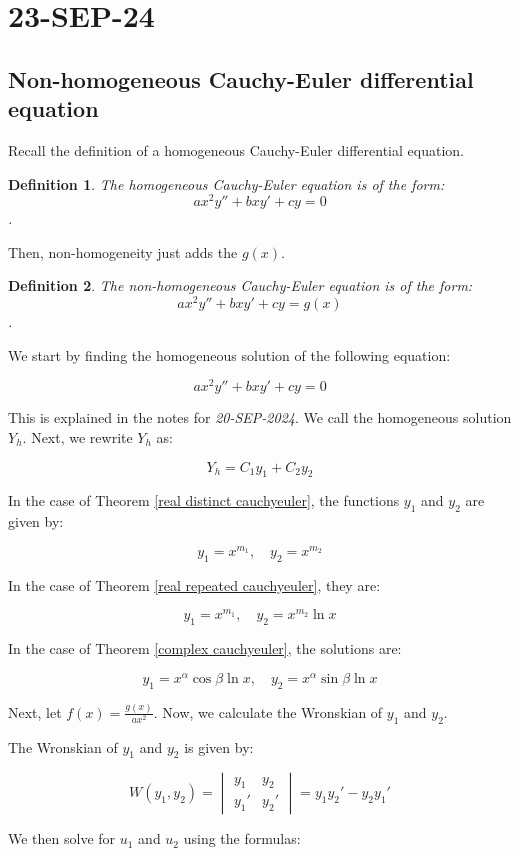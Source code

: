 \documentclass{article}
\newtheorem{defn}{Definition}
\theoremstyle{definition}
\begin{document}
\section{23-SEP-24}
\subsection{Non-homogeneous Cauchy-Euler differential equation}
Recall the definition of a homogeneous Cauchy-Euler differential equation.
\begin{defn}
    The homogeneous Cauchy-Euler equation is of the form:
    \[ ax^2y'' + bxy' + cy = 0 \]. 
\end{defn}

Then, non-homogeneity just adds the $g(x)$.
\begin{defn}
    The non-homogeneous Cauchy-Euler equation is of the form:
    \[ ax^2y'' + bxy' + cy = g(x) \]. 
\end{defn}

We start by finding the homogeneous solution of the following equation:

\[
ax^2 y'' + bxy' + cy = 0
\]

This is explained in the notes for \textit{20-SEP-2024}. We call the homogeneous solution \( Y_h \). Next, we rewrite \( Y_h \) as:

\[
Y_h = C_1 y_1 + C_2 y_2
\]

In the case of Theorem \ref{real distinct cauchyeuler}, the functions \( y_1 \) and \( y_2 \) are given by:

\[
y_1 = x^{m_1}, \quad y_2 = x^{m_2}
\]

In the case of Theorem \ref{real repeated cauchyeuler}, they are:

\[
y_1 = x^{m_1}, \quad y_2 = x^{m_2} \ln{x}
\]

In the case of Theorem \ref{complex cauchyeuler}, the solutions are:

\[
y_1 = x^\alpha \cos{\beta \ln{x}}, \quad y_2 = x^\alpha \sin{\beta \ln{x}}
\]

Next, let \( f(x) = \frac{g(x)}{ax^2} \). Now, we calculate the Wronskian of \( y_1 \) and \( y_2 \).

The Wronskian of \( y_1 \) and \( y_2 \) is given by:

\[
W(y_1, y_2) =
\begin{vmatrix}
y_1 & y_2 \\
y_1' & y_2'
\end{vmatrix}
= y_1 y_2' - y_2 y_1'
\]

We then solve for \( u_1 \) and \( u_2 \) using the formulas:
\end{document}
